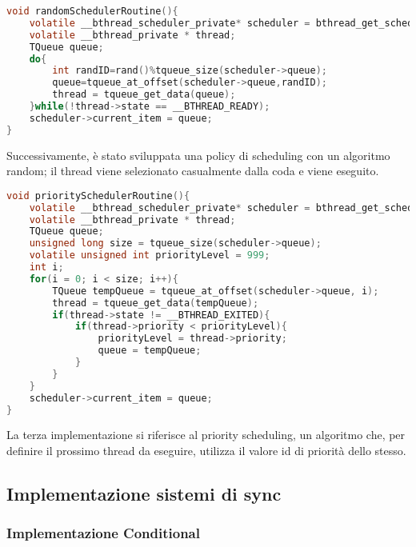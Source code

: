 \documentclass{article}
\begin{document}
\begin{lstlisting}[language=C]
void randomSchedulerRoutine(){
    volatile __bthread_scheduler_private* scheduler = bthread_get_scheduler();
    volatile __bthread_private * thread;
    TQueue queue;
    do{
        int randID=rand()%tqueue_size(scheduler->queue);
        queue=tqueue_at_offset(scheduler->queue,randID);
        thread = tqueue_get_data(queue);
    }while(!thread->state == __BTHREAD_READY);
    scheduler->current_item = queue;
}
\end{lstlisting}

Successivamente, è stato sviluppata una policy di scheduling con un algoritmo random; il thread viene selezionato casualmente dalla coda e viene eseguito.

\begin{lstlisting}[language=C]
void prioritySchedulerRoutine(){
    volatile __bthread_scheduler_private* scheduler = bthread_get_scheduler();
    volatile __bthread_private * thread;
    TQueue queue;
    unsigned long size = tqueue_size(scheduler->queue);
    volatile unsigned int priorityLevel = 999;
    int i;
    for(i = 0; i < size; i++){
        TQueue tempQueue = tqueue_at_offset(scheduler->queue, i);
        thread = tqueue_get_data(tempQueue);
        if(thread->state != __BTHREAD_EXITED){
            if(thread->priority < priorityLevel){
                priorityLevel = thread->priority;
                queue = tempQueue;
            }
        }
    }
    scheduler->current_item = queue;
}
\end{lstlisting}

La terza implementazione si riferisce al priority scheduling, un algoritmo che, per definire il prossimo thread da eseguire, utilizza il valore id di priorità dello stesso.

\vspace{2mm}

\subsection{Implementazione sistemi di sync}
\vspace{2mm}

\subsubsection{Implementazione Conditional}
\vspace{2mm}
\end{document}
